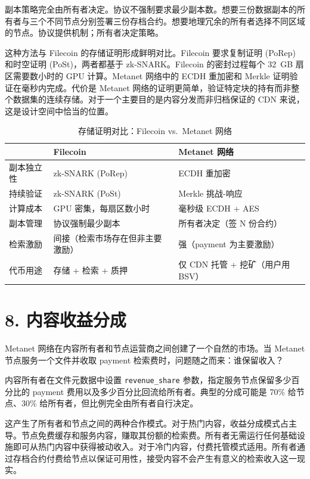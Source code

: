 \documentclass[11pt,a4paper]{article}
\begin{document}
副本策略完全由所有者决定。协议不强制要求最少副本数。想要三份数据副本的所有者与三个不同节点分别签署三份存档合约。想要地理冗余的所有者选择不同区域的节点。协议提供机制；所有者决定策略。

这种方法与 Filecoin 的存储证明形成鲜明对比。Filecoin 要求复制证明 (PoRep) 和时空证明 (PoSt)，两者都基于 zk-SNARK。Filecoin 的密封过程每个 32~GB 扇区需要数小时的 GPU 计算。Metanet 网络中的 ECDH 重加密和 Merkle 证明验证在毫秒内完成。代价是 Metanet 网络的证明更简单，验证特定块的持有而非整个数据集的连续存储。对于一个主要目的是内容分发而非归档保证的 CDN 来说，这是设计空间中恰当的位置。

\begin{table}[htbp]
\centering
\small
\begin{tabularx}{\textwidth}{@{}l >{\raggedright\arraybackslash}X >{\raggedright\arraybackslash}X@{}}
\toprule
 & \textbf{Filecoin} & \textbf{Metanet 网络} \\
\midrule
副本独立性 & zk-SNARK (PoRep) & ECDH 重加密 \\
持续验证 & zk-SNARK (PoSt) & Merkle 挑战-响应 \\
计算成本 & GPU 密集，每扇区数小时 & 毫秒级 ECDH + AES \\
副本管理 & 协议强制最少副本 & 所有者决定（签 N 份合约） \\
检索激励 & 间接（检索市场存在但非主要激励） & 强（payment 为主要激励） \\
代币用途 & 存储 + 检索 + 质押 & 仅 CDN 托管 + 挖矿（用户用 BSV） \\
\bottomrule
\end{tabularx}
\caption{存储证明对比：Filecoin vs.\ Metanet 网络}
\end{table}

\section{8. 内容收益分成}

Metanet 网络在内容所有者和节点运营商之间创建了一个自然的市场。当 Metanet 节点服务一个文件并收取 payment 检索费时，问题随之而来：谁保留收入？

内容所有者在文件元数据中设置 \texttt{revenue\_share} 参数，指定服务节点保留多少百分比的 payment 费用以及多少百分比回流给所有者。典型的分成可能是 70\% 给节点、30\% 给所有者，但比例完全由所有者自行决定。

这产生了所有者和节点之间的两种合作模式。对于热门内容，收益分成模式占主导。节点免费缓存和服务内容，赚取其份额的检索费。所有者无需运行任何基础设施即可从热门内容中获得被动收入。对于冷门内容，付费托管模式适用。所有者通过存档合约付费给节点以保证可用性，接受内容不会产生有意义的检索收入这一现实。
\end{document}
